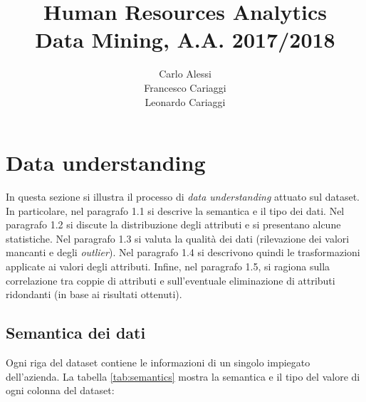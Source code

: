 \documentclass[a4paper]{article}
\title{Human Resources Analytics \\ Data Mining, A.A. 2017/2018}
\author{Carlo Alessi \\ Francesco Cariaggi \\ Leonardo Cariaggi}
\begin{document}
\sloppy %
\maketitle
\date{}

\tableofcontents

\newpage

\section{Data understanding}

In questa sezione si illustra il processo di \textit{data understanding} attuato sul dataset. In particolare, nel paragrafo 1.1 si descrive la semantica e il tipo dei dati. Nel paragrafo 1.2 si discute la distribuzione degli attributi e si presentano alcune statistiche. Nel paragrafo 1.3 si valuta la qualità dei dati (rilevazione dei valori mancanti e degli \textit{outlier}). Nel paragrafo 1.4 si descrivono quindi le trasformazioni applicate ai valori degli attributi. Infine, nel paragrafo 1.5, si ragiona sulla correlazione tra coppie di attributi e sull'eventuale eliminazione di attributi ridondanti (in base ai risultati ottenuti).

\subsection{Semantica dei dati}

Ogni riga del dataset contiene le informazioni di un singolo impiegato dell'azienda. La tabella \ref{tab:semantics} mostra la semantica e il tipo del valore di ogni colonna del dataset:
\end{document}
